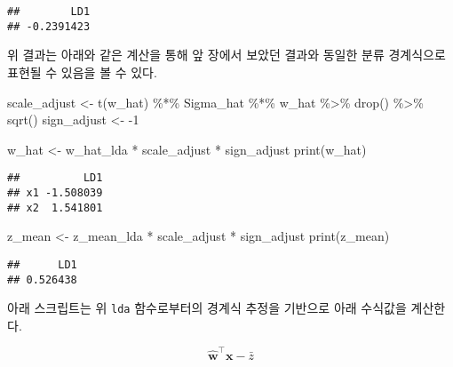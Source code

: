 \documentclass[
]{book}
\newenvironment{Shaded}{\begin{snugshade}}{\end{snugshade}}
\newcommand{\DecValTok}[1]{\textcolor[rgb]{0.00,0.00,0.81}{#1}}
\newcommand{\FunctionTok}[1]{\textcolor[rgb]{0.00,0.00,0.00}{#1}}
\newcommand{\NormalTok}[1]{#1}
\newcommand{\OtherTok}[1]{\textcolor[rgb]{0.56,0.35,0.01}{#1}}
\newcommand{\SpecialCharTok}[1]{\textcolor[rgb]{0.00,0.00,0.00}{#1}}
\begin{document}
\begin{verbatim}
##        LD1 
## -0.2391423
\end{verbatim}

위 결과는 아래와 같은 계산을 통해 앞 장에서 보았던 결과와 동일한 분류 경계식으로 표현될 수 있음을 볼 수 있다.

\begin{Shaded}
\begin{Highlighting}[]
\NormalTok{scale\_adjust }\OtherTok{\textless{}{-}} \FunctionTok{t}\NormalTok{(w\_hat) }\SpecialCharTok{\%*\%}\NormalTok{ Sigma\_hat }\SpecialCharTok{\%*\%}\NormalTok{ w\_hat }\SpecialCharTok{\%\textgreater{}\%} \FunctionTok{drop}\NormalTok{() }\SpecialCharTok{\%\textgreater{}\%} \FunctionTok{sqrt}\NormalTok{()}
\NormalTok{sign\_adjust }\OtherTok{\textless{}{-}} \SpecialCharTok{{-}}\DecValTok{1}

\NormalTok{w\_hat }\OtherTok{\textless{}{-}}\NormalTok{ w\_hat\_lda }\SpecialCharTok{*}\NormalTok{ scale\_adjust }\SpecialCharTok{*}\NormalTok{ sign\_adjust}
\FunctionTok{print}\NormalTok{(w\_hat)}
\end{Highlighting}
\end{Shaded}

\begin{verbatim}
##          LD1
## x1 -1.508039
## x2  1.541801
\end{verbatim}

\begin{Shaded}
\begin{Highlighting}[]
\NormalTok{z\_mean }\OtherTok{\textless{}{-}}\NormalTok{ z\_mean\_lda }\SpecialCharTok{*}\NormalTok{ scale\_adjust }\SpecialCharTok{*}\NormalTok{ sign\_adjust }
\FunctionTok{print}\NormalTok{(z\_mean)}
\end{Highlighting}
\end{Shaded}

\begin{verbatim}
##      LD1 
## 0.526438
\end{verbatim}

아래 스크립트는 위 \texttt{lda} 함수로부터의 경계식 추정을 기반으로 아래 수식값을 계산한다.

\begin{equation*}
\hat{\mathbf{w}}^\top \mathbf{x} - \bar{z}
\end{equation*}

\begin{Shaded}
\end{Shaded}
\end{document}
